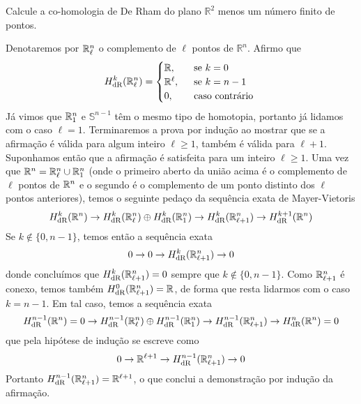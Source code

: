 \begin{Mybox}
Calcule a co-homologia de De Rham do plano $\mathbb{R}^2$ menos um número finito de pontos.
\vspace{-.4cm}
\end{Mybox}
\vspace{-.4cm}

\begin{dem}
Denotaremos por $\mathbb{R}^n_{\ell}$ o complemento de $\ell$ pontos de $\mathbb{R}^n$. Afirmo que 
$$
H_{\text{dR}}^k(\mathbb{R}^n_{\ell}) =\begin{cases}
\mathbb{R}, & \ \text{ se } k = 0 \\
\mathbb{R}^{\ell}, & \ \text{ se } k = n- 1 \\
0, & \ \text{ caso contrário } 
\end{cases}
$$
Já vimos que $\mathbb{R}^n_1$ e $\mathbb{S}^{n-1}$ têm o mesmo tipo de homotopia, portanto já lidamos com o caso $\ell = 1$. Terminaremos a prova por indução ao mostrar que se a afirmação é válida para algum inteiro $\ell \geq 1$, também é válida para $\ell+1$. Suponhamos então que a afirmação é satisfeita para um inteiro $\ell \geq 1$. Uma vez que $\mathbb{R}^n = \mathbb{R}^n_{\ell} \cup \mathbb{R}^n_1$ (onde o primeiro aberto da união acima é o complemento de $\ell$ pontos de $\mathbb{R}^n$ e o segundo é o complemento de um ponto distinto dos $\ell$ pontos anteriores), temos o seguinte pedaço da sequência exata de Mayer-Vietoris
\[
H^k_{\text{dR}}(\mathbb{R}^n) \to H^k_{\text{dR}}(\mathbb{R}^n_{\ell}) \oplus H^k_{\text{dR}}(\mathbb{R}^n_1) \to H^k_{\text{dR}}(\mathbb{R}^n_{\ell+1}) \to H^{k+1}_{\text{dR}}(\mathbb{R}^n)
\]
Se $k \notin \{0, n-1\}$, temos então a sequência exata
\[
0 \to 0 \to H^k_{\text{dR}}(\mathbb{R}^n_{\ell+1}) \to 0
\]
donde concluímos que $H^k_{\text{dR}}(\mathbb{R}^n_{\ell+1}) = 0$ sempre que $k \notin \{0,n-1 \}$. Como $\mathbb{R}^n_{\ell+1}$ é conexo, temos também $H^0_{\text{dR}}(\mathbb{R}^n_{\ell+1}) = \mathbb{R}$, de forma que resta lidarmos com o caso $k = n - 1$. Em tal caso, temos a sequência exata
\[
H^{n-1}_{\text{dR}}(\mathbb{R}^n) = 0 \to H^{n-1}_{\text{dR}}(\mathbb{R}^n_{\ell}) \oplus H^{n-1}_{\text{dR}}(\mathbb{R}^n_1) \to H^{n-1}_{\text{dR}}(\mathbb{R}^n_{\ell+1}) \to H^{n}_{\text{dR}}(\mathbb{R}^{n}) = 0
\]
que pela hipótese de indução se escreve como
\[
0 \to \mathbb{R}^{\ell+1} \to H^{n-1}_{\text{dR}}(\mathbb{R}^n_{\ell+1}) \to 0
\]
Portanto $H^{n-1}_{\text{dR}}(\mathbb{R}^n_{\ell+1}) = \mathbb{R}^{\ell +1}$, o que conclui a demonstração por indução da afirmação.
\end{dem}

